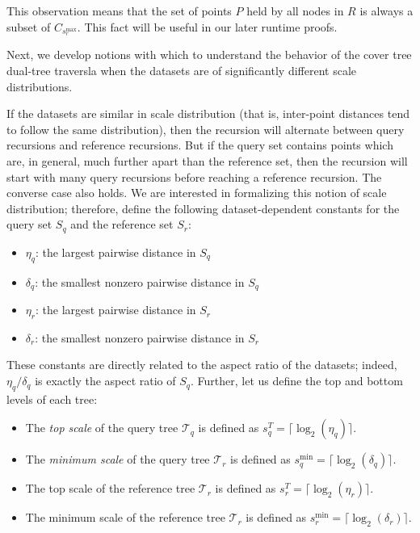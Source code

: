 This observation means that the set of points $P$ held by all nodes in $R$ is
always a subset of $C_{s_r^{\max}}$.  This fact will be useful in our later
runtime proofs.

Next, we develop notions with which to understand the behavior of the cover tree
dual-tree traversla when the datasets are of significantly different scale
distributions.

If the datasets are similar in scale distribution (that is, inter-point distances
tend to follow the same distribution), then the recursion will alternate between
query recursions and reference recursions.  But if the query set contains points
which are, in general, much further apart than the reference set, then the
recursion will start with many query recursions before reaching a reference
recursion.  The converse case also holds.  We are interested in formalizing
this notion of scale distribution; therefore, define the following
dataset-dependent constants for the query set $S_q$ and the reference set $S_r$:

\begin{itemize}
  \item $\eta_q$: the largest pairwise distance in $S_q$
  \item $\delta_q$: the smallest nonzero pairwise distance in $S_q$
  \item $\eta_r$: the largest pairwise distance in $S_r$
  \item $\delta_r$: the smallest nonzero pairwise distance in $S_r$
\end{itemize}

These constants are directly related to the aspect ratio of the datasets;
indeed, $\eta_q / \delta_q$ is exactly the aspect ratio of $S_q$.  Further,
let us define the top and bottom levels of each tree:

\begin{itemize}
  \item The {\it top scale} of the query tree $\mathscr{T}_q$ is defined as
$s_q^T = \lceil \log_2(\eta_q) \rceil$.
  \item The {\it minimum scale} of the query tree $\mathscr{T}_r$ is defined as
$s_q^{\min} = \lceil \log_2(\delta_q) \rceil$.
  \item The top scale of the reference tree $\mathscr{T}_r$ is defined as $s_r^T
= \lceil \log_2(\eta_r) \rceil$.
  \item The minimum scale of the reference tree $\mathscr{T}_r$ is defined as
$s_r^{\min} = \lceil \log_2(\delta_r) \rceil$.
\end{itemize}

